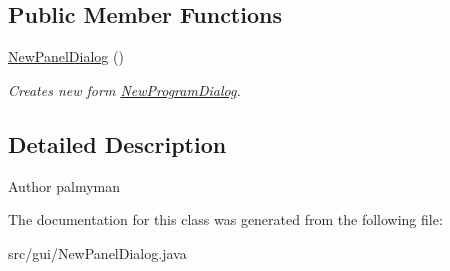 \subsection*{Public Member Functions}
\begin{DoxyCompactItemize}
\item 
\hypertarget{classgui_1_1NewPanelDialog_a325de0e08c74ba14c31c46d70320d369}{\hyperlink{classgui_1_1NewPanelDialog_a325de0e08c74ba14c31c46d70320d369}{New\-Panel\-Dialog} ()}\label{classgui_1_1NewPanelDialog_a325de0e08c74ba14c31c46d70320d369}

\begin{DoxyCompactList}\small\item\em Creates new form \hyperlink{classgui_1_1NewProgramDialog}{New\-Program\-Dialog}. \end{DoxyCompactList}\end{DoxyCompactItemize}


\subsection{Detailed Description}
\begin{DoxyAuthor}{Author}
palmyman 
\end{DoxyAuthor}


The documentation for this class was generated from the following file\-:\begin{DoxyCompactItemize}
\item 
src/gui/New\-Panel\-Dialog.\-java\end{DoxyCompactItemize}
